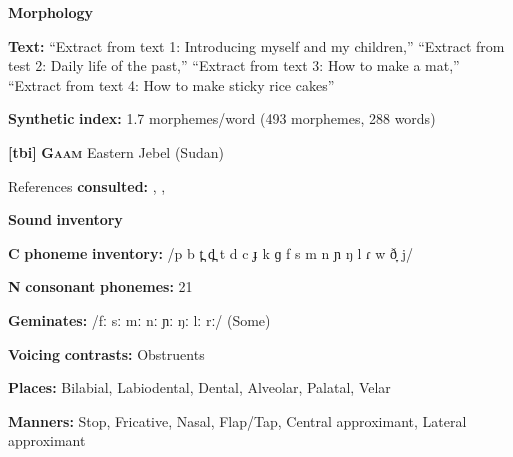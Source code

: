 \documentclass[output=paper]{langsci/langscibook}
\begin{document}
\begin{styleBody}
\textbf{Morphology}
\end{styleBody}

\begin{styleBody}
\textbf{Text:} “Extract from text 1: Introducing myself and my children,” “Extract from test 2: Daily life of the past,” “Extract from text 3: How to make a mat,” “Extract from text 4: How to make sticky rice cakes” \citep[365-372]{Pan2012}
\end{styleBody}

\begin{styleBody}
\textbf{Synthetic} \textbf{index:} 1.7 morphemes/word (493 morphemes, 288 words)
\end{styleBody}

\begin{styleBody}
\textbf{[tbi]}   \textbf{\textsc{Gaam}}  Eastern Jebel (Sudan)
\end{styleBody}

\begin{styleBody}
References \textbf{consulted:} \citet{Bender1983}, \citet{Crewe1975}, \citet{Stirtz2011}
\end{styleBody}

\begin{styleBody}
\textbf{Sound} \textbf{inventory}
\end{styleBody}

\begin{styleBody}
\textbf{C} \textbf{phoneme} \textbf{inventory:} /p b t̪ d̪ t d c ɟ k ɡ f s m n ɲ ŋ l ɾ w ð̞ j/
\end{styleBody}

\begin{styleBody}
\textbf{N} \textbf{consonant} \textbf{phonemes:} 21
\end{styleBody}

\begin{styleBody}
\textbf{Geminates:} /fː sː mː nː ɲː ŋː lː rː/ (Some)
\end{styleBody}

\begin{styleBody}
\textbf{Voicing} \textbf{contrasts:} Obstruents
\end{styleBody}

\begin{styleBody}
\textbf{Places:} Bilabial, Labiodental, Dental, Alveolar, Palatal, Velar
\end{styleBody}

\begin{styleBody}
\textbf{Manners:} Stop, Fricative, Nasal, Flap/Tap, Central approximant, Lateral approximant
\end{styleBody}
\end{document}
